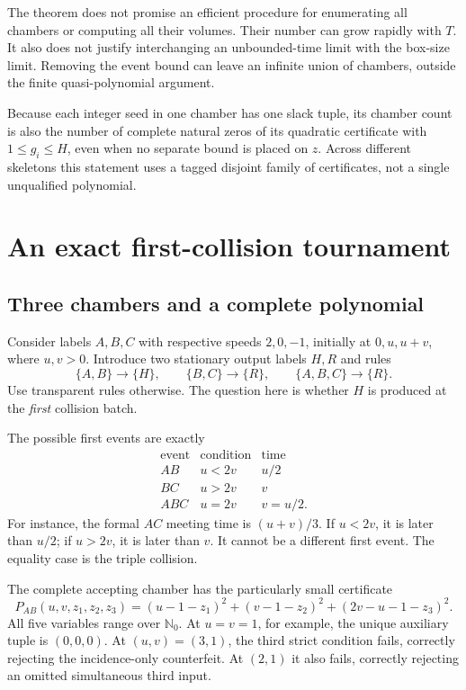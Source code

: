 \documentclass[11pt,letterpaper]{article}
\numberwithin{equation}{section}
\theoremstyle{definition}
\theoremstyle{remark}
\newcommand{\N}{\mathbb N_0}
\begin{document}
The theorem does not promise an efficient procedure for enumerating all
chambers or computing all their volumes. Their number can grow rapidly with
$T$. It also does not justify interchanging an unbounded-time limit with the
box-size limit. Removing the event bound can leave an infinite union of
chambers, outside the finite quasi-polynomial argument.

Because each integer seed in one chamber has one slack tuple, its chamber
count is also the number of complete natural zeros of its quadratic
certificate with $1\le g_i\le H$, even when no separate bound is placed on
$z$. Across different skeletons this statement uses a tagged disjoint family
of certificates, not a single unqualified polynomial.

\section{An exact first-collision tournament}
\label{smc:cg:sec:tournament}

\subsection{Three chambers and a complete polynomial}

Consider labels $A,B,C$ with respective speeds $2,0,-1$, initially at
$0,u,u+v$, where $u,v>0$. Introduce two stationary output labels $H,R$ and
rules
\[
 \{A,B\}\longrightarrow\{H\},\qquad
 \{B,C\}\longrightarrow\{R\},\qquad
 \{A,B,C\}\longrightarrow\{R\}.
\]
Use transparent rules otherwise. The question here is whether $H$ is
produced at the \emph{first} collision batch.

The possible first events are exactly
\begin{equation}
 \begin{array}{c|c|c}
 \text{event}&\text{condition}&\text{time}\\\hline
 AB&u<2v&u/2\\
 BC&u>2v&v\\
 ABC&u=2v&v=u/2.
 \end{array}
 \label{smc:cg:eq:tournament}
\end{equation}
For instance, the formal $AC$ meeting time is $(u+v)/3$. If $u<2v$, it is
later than $u/2$; if $u>2v$, it is later than $v$. It cannot be a different
first event. The equality case is the triple collision.

The complete accepting chamber has the particularly small certificate
\begin{equation}
 P_{AB}(u,v,z_1,z_2,z_3)=
 (u-1-z_1)^2+(v-1-z_2)^2+(2v-u-1-z_3)^2.
 \label{smc:cg:eq:tournamentpoly}
\end{equation}
All five variables range over $\N$. At $u=v=1$, for example, the unique
auxiliary tuple is $(0,0,0)$. At $(u,v)=(3,1)$, the third strict condition
fails, correctly rejecting the incidence-only counterfeit. At $(2,1)$ it
also fails, correctly rejecting an omitted simultaneous third input.
\end{document}
